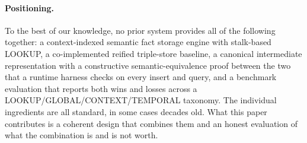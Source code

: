 \paragraph{Positioning.}
To the best of our knowledge, no prior system provides all of the following
together: a context-indexed semantic fact storage engine with stalk-based
LOOKUP, a co-implemented reified triple-store baseline, a canonical
intermediate representation with a constructive semantic-equivalence proof
between the two that a runtime harness checks on every insert and query, and
a benchmark evaluation that reports both wins and losses
across a LOOKUP/GLOBAL/CONTEXT/TEMPORAL taxonomy. The individual ingredients are all standard,
in some cases decades old. What this paper contributes is a coherent design
that combines them and an honest evaluation of what the combination is and is
not worth.
